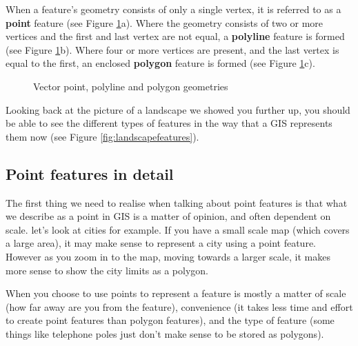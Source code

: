 When a feature's geometry consists of only a single vertex, it is referred to
as a \textbf{point} feature (see Figure \ref{fig:geometries}a). Where the
geometry consists of two or more vertices and the first and last vertex are
not equal, a \textbf{polyline} feature is formed (see Figure
\ref{fig:geometries}b). Where four or more vertices are present, and the
last vertex is equal to the first, an enclosed \textbf{polygon} feature is
formed (see Figure \ref{fig:geometries}c).

\begin{figure}[ht]
\centering
\caption{Vector point, polyline and polygon geometries}\label{fig:geometries}
   \goodgap
   \goodgap
   \goodgap
\end{figure}

Looking back at the picture of a landscape we showed you further up, you
should be able to see the different types of features in the way that a GIS
represents them now (see Figure \ref{fig:landscapefeatures}).

\subsection{Point features in detail}\label{subsec:poifeatures}

The first thing we need to realise when talking about point features is that
what  we describe as a point in GIS is a matter of opinion, and often
dependent on scale. let's look at cities for example. If you have a small
scale map (which covers a large area), it may make sense to represent  a city
using a point feature. However as you zoom in to the map, moving towards a
larger scale, it makes more sense to show the city limits as a polygon.

When you choose to use points to represent a feature is mostly a matter of
scale (how far away are you from the feature), convenience (it takes less
time and effort to create point features than polygon features), and the type
of feature (some things like telephone poles just don't make sense to be
stored as polygons).

